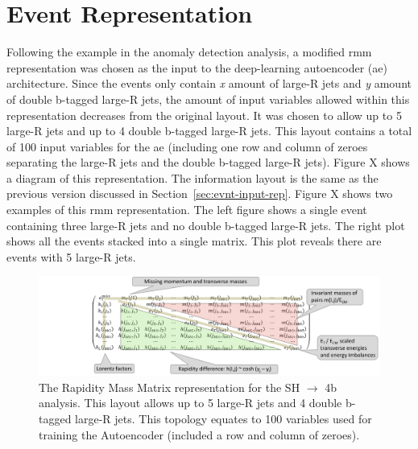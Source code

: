 \section{Event Representation}

Following the example in the anomaly detection analysis, a modified \gls{rmm} representation was chosen as the input to the deep-learning autoencoder (\gls{ae}) architecture. 
Since the events only contain \textit{x} amount of large-R jets and \textit{y} amount of double b-tagged large-R jets, the amount of input variables allowed within 
this representation decreases from the original layout. It was chosen to allow up to 5 large-R jets and up to 4 double b-tagged large-R jets. This layout contains a total 
of 100 input variables for the \gls{ae} (including one row and column of zeroes separating the large-R jets and the double b-tagged large-R jets). Figure X shows a diagram 
of this representation. The information layout is the same as the previous version discussed in Section~\ref{sec:evnt-input-rep}. Figure X shows two examples of this \gls{rmm}
representation. The left figure shows a single event containing three large-R jets and no double b-tagged large-R jets. The right plot shows all the events stacked into a single matrix.
This plot reveals there are events with 5 large-R jets. 

\begin{figure}[ht]
    \centering
    \includegraphics[scale=0.45]{figs/ch7/sh4b_rmm.png}%
    \caption{The Rapidity Mass Matrix representation for the SH $\rightarrow$ 4b analysis. This layout allows up to 5 large-R jets and 4 double b-tagged large-R jets. This 
    topology equates to 100 variables used for training the Autoencoder (included a row and column of zeroes).}
\label{fig:sh4b-rmm-diagram}
\end{figure}

